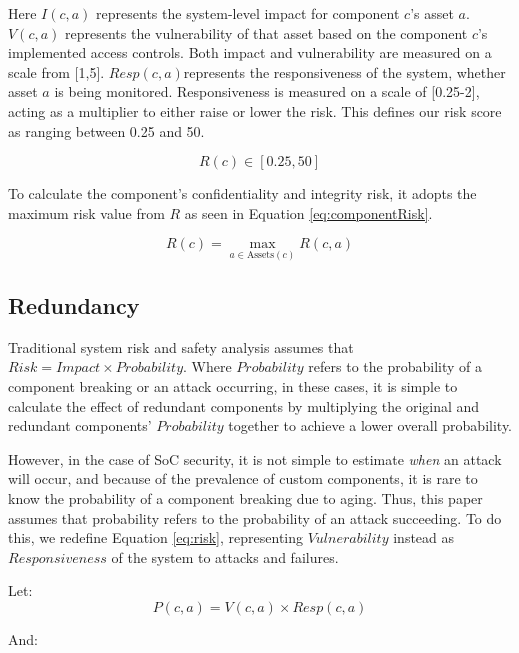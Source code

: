Here $I(c,a)$ represents the system-level impact for component $ c$'s asset $a$. $V(c,a)$ represents the vulnerability of that asset based on the component $c$'s implemented access controls. Both impact and vulnerability are measured on a scale from [1,5]. $Resp(c,a)$represents the responsiveness of the system, whether asset $a$ is being monitored. Responsiveness is measured on a scale of [0.25-2], acting as a multiplier to either raise or lower the risk. This defines our risk score as ranging between 0.25 and 50.

\begin{equation}
    \label{eq:riskRange}
    R(c) \in [0.25,50]
\end{equation}

To calculate the component's confidentiality and integrity risk, it adopts the maximum risk value from $R$ as seen in Equation \ref{eq:componentRisk}.

\begin{equation}
    \label{eq:componentRisk}
    R(c) = \max_{a \in \mathrm{Assets}(c)} R(c,a)
\end{equation}


\subsection{Redundancy}

Traditional system risk and safety analysis assumes that $Risk = Impact \times Probability$. Where $Probability$ refers to the probability of a component breaking or an attack occurring, in these cases, it is simple to calculate the effect of redundant components by multiplying the original and redundant components' $Probability$ together to achieve a lower overall probability.

However, in the case of SoC security, it is not simple to estimate \textit{when} an attack will occur, and because of the prevalence of custom components, it is rare to know the probability of a component breaking due to aging. Thus, this paper assumes that probability refers to the probability of an attack succeeding. To do this, we redefine Equation \ref{eq:risk}, representing $Vulnerability$ instead as $Responsiveness$ of the system to attacks and failures. 

Let:
\begin{equation}
    \label{eq:probability}
    P(c,a) = V(c,a) \times Resp(c,a)
\end{equation}

And:

